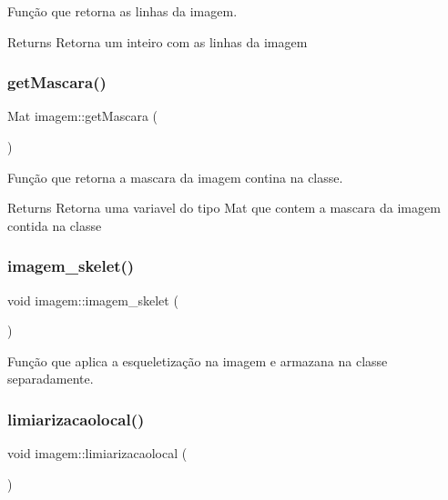 Função que retorna as linhas da imagem. 

\begin{DoxyReturn}{Returns}
Retorna um inteiro com as linhas da imagem 
\end{DoxyReturn}
\mbox{\label{classimagem_a0acb8bdd2e3305c22fe0f859c7bb7bb4}} 
\subsubsection{\texorpdfstring{get\+Mascara()}{getMascara()}}
{\footnotesize\ttfamily Mat imagem\+::get\+Mascara (\begin{DoxyParamCaption}{ }\end{DoxyParamCaption})}



Função que retorna a mascara da imagem contina na classe. 

\begin{DoxyReturn}{Returns}
Retorna uma variavel do tipo Mat que contem a mascara da imagem contida na classe 
\end{DoxyReturn}
\mbox{\label{classimagem_af4ba91ae6fe7753c8b28b8da5580f957}} 
\subsubsection{\texorpdfstring{imagem\+\_\+skelet()}{imagem\_skelet()}}
{\footnotesize\ttfamily void imagem\+::imagem\+\_\+skelet (\begin{DoxyParamCaption}{ }\end{DoxyParamCaption})}



Função que aplica a esqueletização na imagem e armazana na classe separadamente. 

\mbox{\label{classimagem_a1a3b8c5e2b35c7864a23e105e98b66f0}} 
\subsubsection{\texorpdfstring{limiarizacaolocal()}{limiarizacaolocal()}}
{\footnotesize\ttfamily void imagem\+::limiarizacaolocal (\begin{DoxyParamCaption}{ }\end{DoxyParamCaption})}



